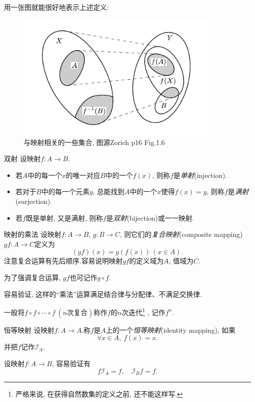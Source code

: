 用一张图就能很好地表示上述定义: 

\begin{figure}[h!]
	\centering
	\includegraphics[width=10cm]{attachment/Acr1745354698752707434.pdf}
	\caption{与映射相关的一些集合, 图源Zorich p16 Fig.1.6}
\end{figure}

\begin{definition}{双射}
	设映射$f: A \to B$.
	\begin{itemize}
		\item 若$A$中的每一个$x$的唯一对应$B$中的一个$f(x)$, 则称$f$是\textit{单射}(injection).
		\item 若对于$B$中的每一个元素$y$, 总能找到$A$中的一个$x$使得$f(x)=y$, 则称$f$是\textit{满射}(surjection).
		\item 若$f$既是单射, 又是满射, 则称$f$是\textit{双射}(bijection)或一一映射.
	\end{itemize}
\end{definition}

\begin{definition}{映射的乘法}
    设映射$f: A \to B$, $g: B \to C$, 则它们的\textit{复合映射}(composite mapping)~$gf: A \to C$定义为$$(gf)(x)=g(f(x)) \ (x \in A).$$
    注意复合运算有先后顺序.容易说明映射$gf$的定义域为$A$, 值域为$C$.
\end{definition}
\begin{remark}
	为了强调复合运算, $gf$也可记作$g \circ f$.
\end{remark}

容易验证, 这样的“乘法”运算满足结合律与分配律、不满足交换律.

一般将$f \circ f \circ \cdots \circ f~(n\textit{次复合})$称作$f$的$n$次迭代\footnote{严格来说, 在获得自然数集的定义之前, 还不能这样写.} , 记作$f^n$.

\begin{definition}{恒等映射}
	设映射$f: A \to A$.称$f$是$A$上的一个\textit{恒等映射}(identity mapping), 如果$$\forall x\in A, ~f(x)=x.$$
	并把$f$记作$\mathcal{I}_A$.
\end{definition}
\begin{remark}
	设映射$f :  A \to B$, 容易验证有$$f\mathcal{I}_A=f, \quad \mathcal{I}_Bf=f.$$
\end{remark}

